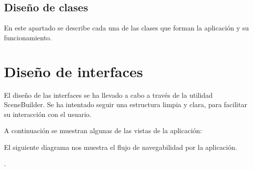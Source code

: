 



\subsection{Diseño de clases}

En este apartado se describe cada una de las clases que forman la aplicación y su funcionamiento.

\begin{landscape}
\end{landscape}

\newpage
\section{Diseño de interfaces}

El diseño de las interfaces se ha llevado a cabo a través de la utilidad SceneBuilder. Se ha intentado seguir una estructura limpia y clara, para facilitar su interacción con el usuario.

A continuación se muestran algunas de las vistas de la aplicación:




El siguiente diagrama nos muestra el flujo de navegabilidad por la aplicación.


.


